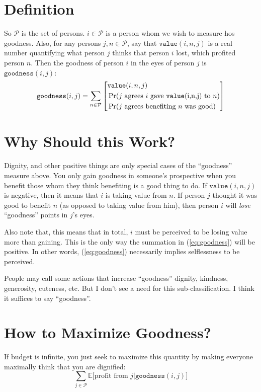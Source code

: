 \documentclass{report}
\begin{document}
\section{Definition}
So $\mathcal{P}$ is the set of persons. $i \in \mathcal{P}$ is a person whom we
wish to measure hos goodness.  Also, for any persons $j,n \in \mathcal{P}$, say
that $\texttt{value}(i,n,j)$ is a real number quantifying what person $j$
thinks that person $i$ lost, which profited person $n$. Then the goodness of
person $i$ in the eyes of person $j$ is $\texttt{goodness}(i,j)$:
\begin{equation}
\label{eq:goodness}
\texttt{goodness}(i,j) = 
\sum_{n \in \mathcal{P}}
\left[
\begin{split}
&\texttt{value}(i,n,j)\\
&\Pr(\text{$j$ agrees $i$ gave \texttt{value}(i,n,j) to $n$})\\
&\Pr(\text{$j$ agrees benefiting $n$ was good})\\
\end{split}
\right]
\end{equation}

\section{Why Should this Work?}
Dignity, and other positive things are only special cases of the ``goodness''
measure above. You only gain goodness in someone's prospective when you benefit
those whom they think benefiting is a good thing to do. If
$\texttt{value}(i,n,j)$ is negative, then it means that $i$ is taking value
from $n$. If person $j$ thought it was good to benefit $n$ (as opposed to
taking value from him), then person $i$ will \emph{lose} ``goodness'' points
in $j$'s eyes.

Also note that, this means that in total, $i$ must be perceived to be losing
value more than gaining. This is the only way the summation in
(\ref{eq:goodness}) will be positive. In other words, (\ref{eq:goodness})
necessarily implies selflessness to be perceived.

People may call some actions that increase ``goodness'' dignity, kindness,
generosity, cuteness, etc. But I don't see a need for this sub-classification.
I think it suffices to say ``goodness''.


\section{How to Maximize Goodness?}
If budget is infinite, you just seek to maximize this quantity by making
everyone maximally think that you are dignified:
\[
\sum_{j \in \mathcal{P}}
\mathbb{E}\big[
    \text{profit from $j$} 
    \big|
    \texttt{goodness}(i,j)
\big]
\]
\end{document}
